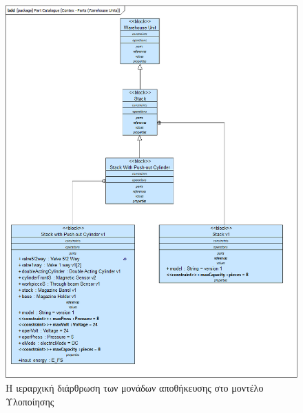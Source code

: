 \documentclass[a4paper,12pt,twoside]{report}
\begin{document}
{\begin{appendices}
				\begin{figure}[hp]
					\centering
					\includegraphics[scale=0.50]{DesignModel_Contex-Parts(WarehouseUnits).png}
					\caption{Η ιεραρχική διάρθρωση των μονάδων αποθήκευσης στο μοντέλο Υλοποίησης}
					\label{φωτ:Η ιεραρχική διάρθρωση των μονάδων αποθήκευσης στο μοντέλο Υλοποίησης}
				\end{figure}
				

\end{appendices}}
\end{document}
